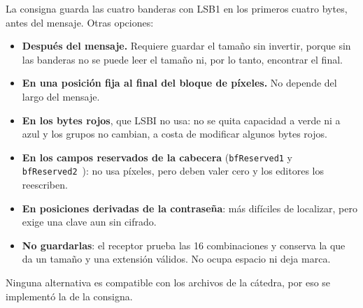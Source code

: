 
La consigna guarda las cuatro banderas con LSB1 en los primeros cuatro bytes, antes del mensaje. Otras opciones:
\begin{itemize}
\item \textbf{Después del mensaje.} Requiere guardar el tamaño sin invertir, porque sin las banderas no se puede leer el tamaño ni, por lo tanto, encontrar el final.
\item \textbf{En una posición fija al final del bloque de píxeles.} No depende del largo del mensaje.
\item \textbf{En los bytes rojos}, que LSBI no usa: no se quita capacidad a verde ni a azul y los grupos no cambian, a costa de modificar algunos bytes rojos.
\item \textbf{En los campos reservados de la cabecera} (\texttt{bfReserved1} y \texttt{bfReserved2}~\cite{microsoftbmp}): no usa píxeles, pero deben valer cero y los editores los reescriben.
\item \textbf{En posiciones derivadas de la contraseña}: más difíciles de localizar, pero exige una clave aun sin cifrado.
\item \textbf{No guardarlas}: el receptor prueba las 16 combinaciones y conserva la que da un tamaño y una extensión válidos. No ocupa espacio ni deja marca.
\end{itemize}
Ninguna alternativa es compatible con los archivos de la cátedra, por eso se implementó la de la consigna.
